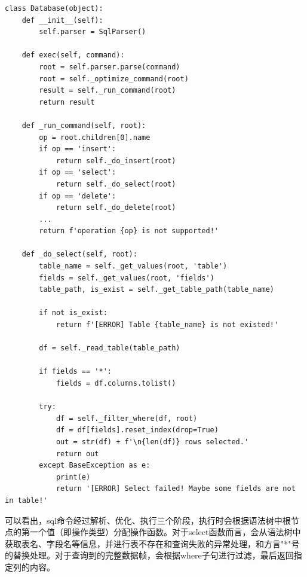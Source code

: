 \begin{lstlisting}
class Database(object):
    def __init__(self):
        self.parser = SqlParser()

    def exec(self, command):
        root = self.parser.parse(command)
        root = self._optimize_command(root)
        result = self._run_command(root)
        return result
    
    def _run_command(self, root):
        op = root.children[0].name
        if op == 'insert':
            return self._do_insert(root)
        if op == 'select':
            return self._do_select(root)
        if op == 'delete':
            return self._do_delete(root)
        ...
        return f'operation {op} is not supported!'
    
    def _do_select(self, root):
        table_name = self._get_values(root, 'table')
        fields = self._get_values(root, 'fields')
        table_path, is_exist = self._get_table_path(table_name)

        if not is_exist:
            return f'[ERROR] Table {table_name} is not existed!'
        
        df = self._read_table(table_path)
        
        if fields == '*':
            fields = df.columns.tolist()
        
        try:
            df = self._filter_where(df, root)
            df = df[fields].reset_index(drop=True)
            out = str(df) + f'\n{len(df)} rows selected.'
            return out
        except BaseException as e:
            print(e)
            return '[ERROR] Select failed! Maybe some fields are not in table!'
\end{lstlisting}

可以看出，sql命令经过解析、优化、执行三个阶段，执行时会根据语法树中根节点的第一个值（即操作类型）分配操作函数。对于select函数而言，会从语法树中获取表名、字段名等信息，并进行表不存在和查询失败的异常处理，和方言"*"号的替换处理。对于查询到的完整数据帧，会根据where子句进行过滤，最后返回指定列的内容。